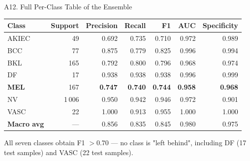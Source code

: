 \documentclass[10pt, aspectratio=169]{beamer}
\begin{document}
\begin{frame}{A12. Full Per-Class Table of the Ensemble}
    \scriptsize
    \begin{table}[]
        \centering
        \begin{tabular}{lrrrrrr}
        \toprule
        \rowcolor{usthblue!25} \textbf{Class} & \textbf{Support} & \textbf{Precision} & \textbf{Recall} & \textbf{F1} & \textbf{AUC} & \textbf{Specificity} \\
        \midrule
        AKIEC &   49 & 0.692 & 0.735 & 0.710 & 0.972 & 0.989 \\
        BCC   &   77 & 0.875 & 0.779 & 0.825 & 0.996 & 0.994 \\
        BKL   &  165 & 0.792 & 0.800 & 0.796 & 0.968 & 0.974 \\
        DF    &   17 & 0.938 & 0.938 & 0.938 & 0.996 & 0.999 \\
        \textbf{MEL} &  167 & \textbf{0.747} & \textbf{0.740} & \textbf{0.744} & \textbf{0.958} & \textbf{0.968} \\
        NV    & 1\,006 & 0.950 & 0.942 & 0.946 & 0.972 & 0.901 \\
        VASC  &   22 & 1.000 & 0.913 & 0.955 & 1.000 & 1.000 \\
        \midrule
        \textbf{Macro avg} & --- & 0.856 & 0.835 & 0.845 & 0.980 & 0.975 \\
        \bottomrule
        \end{tabular}
    \end{table}
    \vspace{0.15cm}
    \footnotesize All seven classes obtain F1 $> 0.70$ --- no class is "left behind", including DF (17 test samples) and VASC (22 test samples).
\end{frame}
\end{document}
